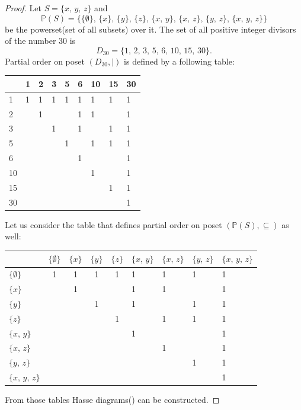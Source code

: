 \documentclass[14pt,a4paper]{extarticle}
\begin{document}
	 \begin{proof}
	 	Let $S = \{x,\, y,\, z\}$ and 
	 	\[\mathbb{P}(S)=\{\{\emptyset\},\,\{x\},\,\{y\},\,\{z\},\,\{x,\, y\},\,\{x,\, z\},\,\{y,\, z\},\,\{x,\, y,\, z\}\}\]
	 	be the powerset(set of all subsets) over it. The set of all positive integer divisors of the number 30 is
	 	\[D_{30}=\{1,\,2,\,3,\,5,\,6,\,10,\,15,\,30\}.\]
	 	Partial order on poset $(D_{30}, |)$ is defined by a following table:
	 	\begin{center}
	 		\begin{tabu}{ |X[c]|X[c]|X[c]|X[c]|X[c]|X[c]|X[c]|X[c]|X[c]|}
	 			\hline
	 			& 1 & 2 & 3 & 5 & 6 & 10 & 15 & 30\\
	 			 & 1 & 1 & 1 & 1 & 1 & 1 & 1 & 1\\
	 			 &  & 1 &  &  & 1 & 1 &  & 1\\
	 			 &  &  & 1 &  & 1 &  & 1 & 1\\
	 			 &  &  &  & 1 &  & 1 & 1 & 1\\
	 			 &  &  &  &  & 1 &  &  & 1\\
	 			 &  &  &  &  &  & 1 &  & 1\\
	 			 &  &  &  &  &  &  & 1 & 1\\
	 			 &  &  &  &  &  &  &  & 1\\
	 			\hline
	 		\end{tabu}
	 	\end{center}
	 	\pagebreak
	 	Let us consider the table that defines partial order on poset $(\mathbb{P}(S), \subseteq)$ as well:
	 	\begin{center}
	 		\begin{tabu}{ |X[c]|c|c|c|c|X[c]|X[c]|X[c]|X[c]|}
	 			\hline
	 			& $\{\emptyset\}$ & $\{x\}$ & $\{y\}$ & $\{z\}$ & $\{x,\, y\}$ & $\{x,\,z\}$ & $\{y,\, z\}$ & $\{x,\, y,\, z\}$\\
	 			\hline
	 			$\{\emptyset\}$ & 1 & 1 & 1 & 1 & 1 & 1 & 1 & 1\\
	 			\hline
	 			$\{x\}$ &  & 1 &  &  & 1 & 1 &  & 1\\
	 			\hline
	 			$\{y\}$ &  &  & 1 &  & 1 &  & 1 & 1\\
	 			\hline
	 			$\{z\}$ &  &  &  & 1 &  & 1 & 1 & 1\\
	 			\hline
	 			$\{x,\, y\}$ &  &  &  &  & 1 &  &  & 1\\
	 			\hline
	 			$\{x,\,z\}$ &  &  &  &  &  & 1 &  & 1\\
	 			\hline
	 			$\{y,\, z\}$ &  &  &  &  &  &  & 1 & 1\\
	 			\hline
	 			$\{x,\, y,\, z\}$ &  &  &  &  &  &  &  & 1\\
	 			\hline
	 		\end{tabu}
	 	\end{center}
	 	From those tables Hasse diagrams() can be constructed. 
	 	

\end{proof}
\end{document}
